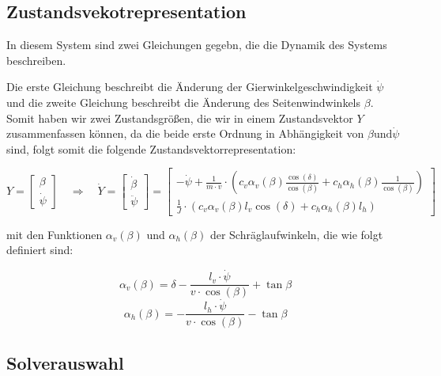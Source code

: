 \subsection{Zustandsvekotrepresentation}

In diesem System sind zwei Gleichungen gegebn, die 
die Dynamik des Systems beschreiben. 

Die erste Gleichung beschreibt die Änderung der Gierwinkelgeschwindigkeit $\dot{\psi}$ und die zweite Gleichung beschreibt die Änderung des Seitenwindwinkels $\beta$.
Somit haben wir zwei Zustandsgrößen, die wir in einem Zustandsvektor $Y$ zusammenfassen können, da die beide erste Ordnung in Abhängigkeit von 
$\beta \text{und} \dot{\psi}$ sind,
folgt somit die folgende Zustandsvektorrepresentation:


\begin{equation}  
Y = 
    \begin{bmatrix}
        \beta \\
        \dot{\psi}
    \end{bmatrix}
    \quad \Rightarrow \quad
    \dot{Y} = 
    \begin{bmatrix}
        \dot{\beta} \\
        \ddot{\psi}
    \end{bmatrix} =
    \begin{bmatrix}
        -\dot{\psi} + \frac{1}{m\cdot v} \cdot (c_v \alpha_v(\beta) \frac{\cos(\delta)}{\cos(\beta)}+ c_h \alpha_h(\beta) \frac{1}{\cos(\beta)}) \\
        \frac{1}{J} \cdot (c_v \alpha_v(\beta) l_v \cos(\delta) + c_h \alpha_h(\beta) l_h)
    \end{bmatrix}
\end{equation}

mit den Funktionen $\alpha_v(\beta)$ und $\alpha_h(\beta)$ der Schräglaufwinkeln, die wie folgt definiert sind:

\begin{equation}
    \alpha_v(\beta) = \delta - \frac{l_v\cdot \dot{\psi}}{v\cdot \cos(\beta)} + \tan{\beta} 
\end{equation}
\begin{equation}
    \alpha_h(\beta) = - \frac{l_h\cdot \dot{\psi}}{v\cdot \cos(\beta)} - \tan{\beta}
\end{equation}


\subsection{Solverauswahl}

